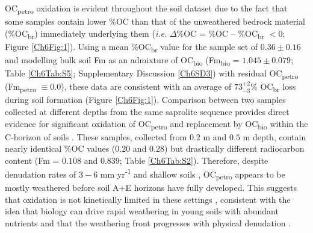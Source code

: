 OC\textsubscript{petro} oxidation is evident throughout the soil dataset due to the fact that some samples contain lower \%OC than that of the unweathered bedrock material (\%OC\textsubscript{br}) immediately underlying them (\textit{i.e.} $\Delta$\%OC = \%OC -- \%OC\textsubscript{br} $< 0$; Figure \ref{Ch6Fig:1}). Using a mean \%OC\textsubscript{br} value for the sample set of $0.36 \pm 0.16$ and modelling bulk soil Fm as an admixture of OC\textsubscript{bio} (Fm\textsubscript{bio} = $1.045 \pm 0.079$; Table \ref{Ch6Tab:S5}; Supplementary Discussion \ref{Ch6SD3}) with residual OC\textsubscript{petro} (Fm\textsubscript{petro} $\equiv 0.0$), these data are consistent with an average of $73^{+2}_{-3}$\% OC\textsubscript{br} loss during soil formation (Figure \ref{Ch6Fig:1}). Comparison between two samples collected at different depths from the same saprolite sequence provides direct evidence for significant oxidation of OC\textsubscript{petro} and replacement by OC\textsubscript{bio} within the C-horizon of soils \citep{Hilton:2013kq}. These samples, collected from $0.2$ m and $0.5$ m depth, contain nearly identical \%OC values ($0.20$ and $0.28$) but drastically different radiocarbon content (Fm = $0.108$ and $0.839$; Table \ref{Ch6Tab:S2}). Therefore, despite denudation rates of $3 - 6$ mm yr\textsuperscript{-1} \citep{Dadson:2003kl} and shallow soils \citep[$\leq 0.8$ m;][]{Tsai:2001vp}, OC\textsubscript{petro} appears to be mostly weathered before soil A+E horizons have fully developed. This suggests that oxidation is not kinetically limited in these settings \citep[\textit{c.f.}][]{Chang:1999vo,Petsch:2001eq}, consistent with the idea that biology can drive rapid weathering in young soils with abundant nutrients and that the weathering front progresses with physical denudation \citep{Brantley:2011ku}.

